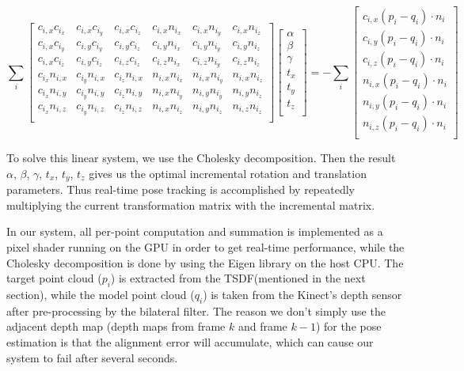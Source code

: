 \documentclass[12pt]{article}
\begin{document}
$$
    \sum_{i}{}
    \begin{bmatrix*}
        c_{i,x}c_{i_x}&c_{i,x}c_{i_y}&c_{i,x}c_{i_z}&c_{i,x}n_{i_x}&c_{i,x}n_{i_y}&c_{i,x}n_{i_z}\\
        c_{i,x}c_{i_y}&c_{i,y}c_{i_y}&c_{i,y}c_{i_z}&c_{i,y}n_{i_x}&c_{i,y}n_{i_y}&c_{i,y}n_{i_z}\\
        c_{i,x}c_{i_z}&c_{i,y}c_{i_z}&c_{i,z}c_{i_z}&c_{i,z}n_{i_x}&c_{i,z}n_{i_y}&c_{i,z}n_{i_z}\\
        c_{i_x}n_{i,x}&c_{i_y}n_{i,x}&c_{i_z}n_{i,x}&n_{i,x}n_{i_x}&n_{i,x}n_{i_y}&n_{i,x}n_{i_z}\\
        c_{i_x}n_{i,y}&c_{i_y}n_{i,y}&c_{i_z}n_{i,y}&n_{i,x}n_{i_y}&n_{i,y}n_{i_y}&n_{i,y}n_{i_z}\\
        c_{i_x}n_{i,z}&c_{i_y}n_{i,z}&c_{i_z}n_{i,z}&n_{i,x}n_{i_z}&n_{i,y}n_{i_z}&n_{i,z}n_{i_z}\\
    \end{bmatrix*}
    \begin{bmatrix*}
        \alpha\\
        \beta\\
        \gamma\\
        t_x\\
        t_y\\
        t_z\\
    \end{bmatrix*}
    =-\sum_{i}{}
    \begin{bmatrix*}
        c_{i,x}(p_i-q_i)\cdot n_i\\
        c_{i,y}(p_i-q_i)\cdot n_i\\
        c_{i,z}(p_i-q_i)\cdot n_i\\
        n_{i,x}(p_i-q_i)\cdot n_i\\
        n_{i,y}(p_i-q_i)\cdot n_i\\
        n_{i,z}(p_i-q_i)\cdot n_i\\
    \end{bmatrix*}
$$

To solve this linear system, we use the Cholesky decomposition. Then the result $\alpha$, $\beta$, $\gamma$, $t_x$, $t_y$, $t_z$ gives us the optimal incremental rotation and translation parameters. Thus real-time pose tracking is accomplished by repeatedly multiplying the current transformation matrix with the incremental matrix.

In our system, all per-point computation and summation is implemented as a pixel shader running on the GPU in order to get real-time performance, while the Cholesky decomposition is done by using the Eigen library on the host CPU. The target point cloud ($p_i$) is extracted from the TSDF(mentioned in the next section), while the model point cloud ($q_i$) is taken from the Kinect's depth sensor after pre-processing by the bilateral filter. The reason we don't simply use the adjacent depth map (depth maps from frame $k$ and frame $k-1$) for the pose estimation is that the alignment error will accumulate, which can cause our system to fail after several seconds.  
\end{document}
